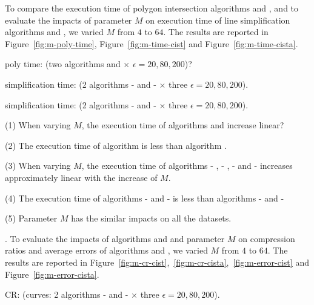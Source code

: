 
To compare the execution time of polygon intersection algorithms \rpia and \cpia, and to evaluate the impacts of parameter $M$ on execution time of line simplification algorithms \cist and \cista, we varied $M$ from $4$ to $64$.
The results are reported in Figure~\ref{fig:m-poly-time}, Figure~\ref{fig:m-time-cist} and Figure~\ref{fig:m-time-cista}.

poly time: (\textcolor[rgb]{0.00,0.07,1.00}{two algorithms \rpia and \cpia $\times$ $\epsilon = 20, 80, 200$})?

simplification time: (\textcolor[rgb]{0.00,0.07,1.00}{2 algorithms \cist - \rpia and \cist - \cpia $\times$  three $\epsilon = 20, 80, 200$}).

simplification time: (\textcolor[rgb]{0.00,0.07,1.00}{2 algorithms \cista- \rpia and \cista- \cpia $\times$  three $\epsilon = 20, 80, 200$}).

\ni(1) When varying $M$, the execution time of algorithms \rpia and \cpia increase linear?

\ni(2) The execution time of algorithm \rpia is less than algorithm \cpia.

\ni(3) When varying $M$, the execution time of algorithms \cist - \rpia, \cist - \cpia, \cista- \rpia and \cista- \cpia increases approximately linear with the increase of $M$.


\ni(4) The execution time of algorithms \cist - \rpia and \cista- \rpia is less than algorithms \cist - \cpia and \cista- \cpia

\ni(5) Parameter $M$ has the similar impacts on all the datasets.

.
To evaluate the impacts of algorithms \rpia and \cpia and parameter $M$ on compression ratios and average errors of algorithms \cist and \cista, we varied $M$ from $4$ to $64$.
The results are reported in Figure~\ref{fig:m-cr-cist},~\ref{fig:m-cr-cista},~\ref{fig:m-error-cist} and Figure~\ref{fig:m-error-cista}.

CR: (\textcolor[rgb]{0.00,0.07,1.00}{curves: 2 algorithms \cist - \rpia and \cist - \cpia $\times$  three $\epsilon = 20, 80, 200$}).

